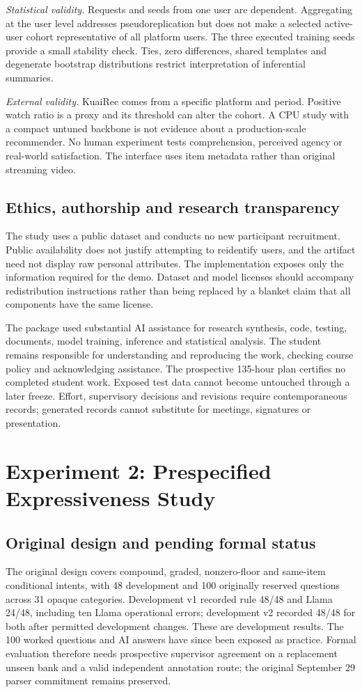 \documentclass[conference]{IEEEtran}
\begin{document}
\textit{Statistical validity.} Requests and seeds from one user are dependent. Aggregating at the user level addresses pseudoreplication but does not make a selected active-user cohort representative of all platform users. The three executed training seeds provide a small stability check. Ties, zero differences, shared templates and degenerate bootstrap distributions restrict interpretation of inferential summaries.

\textit{External validity.} KuaiRec comes from a specific platform and period. Positive watch ratio is a proxy and its threshold can alter the cohort. A CPU study with a compact untuned backbone is not evidence about a production-scale recommender. No human experiment tests comprehension, perceived agency or real-world satisfaction. The interface uses item metadata rather than original streaming video.

\subsection{Ethics, authorship and research transparency}
The study uses a public dataset and conducts no new participant recruitment. Public availability does not justify attempting to reidentify users, and the artifact need not display raw personal attributes. The implementation exposes only the information required for the demo. Dataset and model licenses should accompany redistribution instructions rather than being replaced by a blanket claim that all components have the same license.

The package used substantial AI assistance for research synthesis, code, testing, documents, model training, inference and statistical analysis. The student remains responsible for understanding and reproducing the work, checking course policy and acknowledging assistance. The prospective 135-hour plan certifies no completed student work. Exposed test data cannot become untouched through a later freeze. Effort, supervisory decisions and revisions require contemporaneous records; generated records cannot substitute for meetings, signatures or presentation.

\section{Experiment 2: Prespecified Expressiveness Study}
\subsection{Original design and pending formal status}
The original design covers compound, graded, nonzero-floor and same-item conditional intents, with 48 development and 100 originally reserved questions across 31 opaque categories. Development v1 recorded rule 48/48 and Llama 24/48, including ten Llama operational errors; development v2 recorded 48/48 for both after permitted development changes. These are development results. The 100 worked questions and AI answers have since been exposed as practice. Formal evaluation therefore needs prospective supervisor agreement on a replacement unseen bank and a valid independent annotation route; the original September 29 parser commitment remains preserved.
\end{document}
